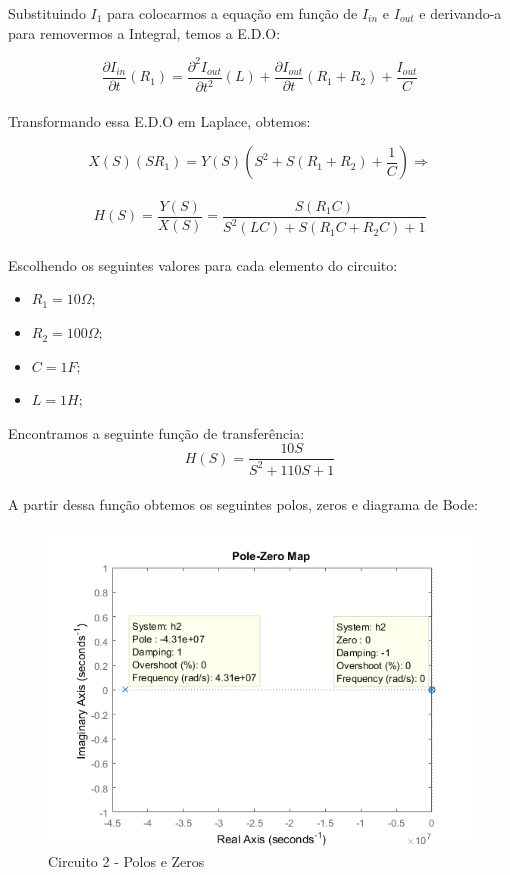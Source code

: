 \documentclass[a4paper, 12pt]{article}
\begin{document}
			Substituindo $I_{1}$ para colocarmos a equação em função de $I_{in}$ e $I_{out}$ e derivando-a para removermos a Integral, temos a E.D.O:
			
			\[	
				\frac{\partial I_{in}}{\partial t}\left(R_{1}\right) = \frac{\partial^{2}I_{out}}{\partial t^{2}}\left(L\right) + \frac{\partial I_{out}}{\partial t}\left(R_{1} + R_{2}\right) + \frac{I_{out}}{C}
			\] 	\\
						
			Transformando essa E.D.O em Laplace, obtemos:
			
			\[	
				X(S)\left(SR_{1}\right) = Y(S)\left(S^{2} + S\left(R_{1} +  R_{2}\right) + \frac{1}{C}\right) \Rightarrow
			\] 	\\			
			\[
			H(S) = \frac{Y(S)}{X(S)} = \frac{S\left(R_{1}C\right)}{S^{2}\left(LC\right) + S\left(R_{1}C + R_{2}C\right) + 1}
			\] 	\\					
			
			Escolhendo os seguintes valores para cada elemento do circuito:
			\begin{itemize}
				\item $R_{1} = 10\Omega;$
				\item $R_{2} = 100\Omega;$
				\item $C = 1F;$
				\item $L = 1H;$
			\end{itemize}	
							
			Encontramos a seguinte função de transferência:
			\[
				H(S) = \frac{10S}{S^{2} + 110S + 1}
			\] 	\\				
			A partir dessa função obtemos os seguintes polos, zeros e diagrama de Bode:
			\begin{figure}[!ht]
				\centering
				\includegraphics[scale=0.8]{img/1e_circ2.png}
				\caption{Circuito 2 - Polos e Zeros}	
			\end{figure}	
\end{document}

